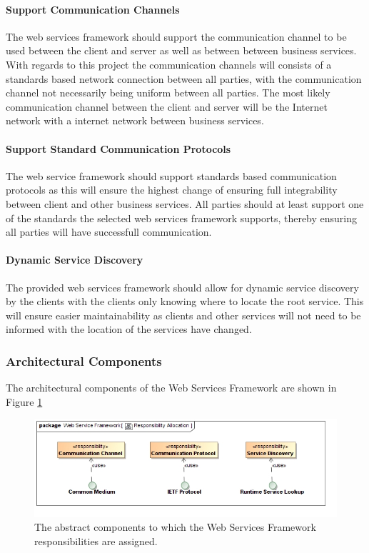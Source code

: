 \paragraph{Support Communication Channels}
The web services framework should support the communication channel to be used
between the client and server as well as between between business services.
With regards to this project the communication channels will consists of a
standards based network connection between all parties, with the communication
channel not necessarily being uniform between all parties. The most likely
communication channel between the client and server will be the Internet
network with a internet network between business services.

\paragraph{Support Standard Communication Protocols}
The web service framework should support standards based communication
protocols as this will ensure the highest change of ensuring full
integrability between client and other business services. All parties should
at least support one of the standards the selected web services framework
supports, thereby ensuring all parties will have successfull communication.

\paragraph{Dynamic Service Discovery}
The provided web services framework should allow for dynamic service discovery
by the clients with the clients only knowing where to locate the root service.
This will ensure easier maintainability as clients and other services will not
need to be informed with the location of the services have changed.

\subsubsection{Architectural Components}
The architectural components of the Web Services Framework are shown in Figure \ref{fig:webServicesFrameworkResponsibilityAllocation}
\begin{figure}[H]
	\begin{center}
	\includegraphics[scale=0.5]{../Diagrams and Charts/Web Services Framework/ResponsibilityAllocation.jpg}
	\caption{The abstract components to which the Web Services Framework responsibilities are assigned.}
	\label{fig:webServicesFrameworkResponsibilityAllocation}
	\end{center}
\end{figure}

